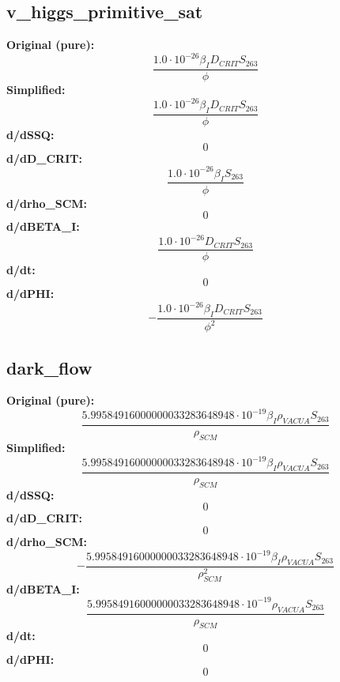 \subsection{v_higgs_primitive_sat}
\textbf{Original (pure):}
\begin{equation}
\frac{1.0 \cdot 10^{-26} \beta_{I} D_{CRIT} S_{26 3}}{\phi}
\end{equation}
\textbf{Simplified:}
\begin{equation}
\frac{1.0 \cdot 10^{-26} \beta_{I} D_{CRIT} S_{26 3}}{\phi}
\end{equation}
\textbf{d/dSSQ:}
\begin{equation}
0
\end{equation}
\textbf{d/dD_CRIT:}
\begin{equation}
\frac{1.0 \cdot 10^{-26} \beta_{I} S_{26 3}}{\phi}
\end{equation}
\textbf{d/drho_SCM:}
\begin{equation}
0
\end{equation}
\textbf{d/dBETA_I:}
\begin{equation}
\frac{1.0 \cdot 10^{-26} D_{CRIT} S_{26 3}}{\phi}
\end{equation}
\textbf{d/dt:}
\begin{equation}
0
\end{equation}
\textbf{d/dPHI:}
\begin{equation}
- \frac{1.0 \cdot 10^{-26} \beta_{I} D_{CRIT} S_{26 3}}{\phi^{2}}
\end{equation}

\subsection{dark_flow}
\textbf{Original (pure):}
\begin{equation}
\frac{5.99584916000000033283648948 \cdot 10^{-19} \beta_{I} \rho_{VAC UA} S_{26 3}}{\rho_{SCM}}
\end{equation}
\textbf{Simplified:}
\begin{equation}
\frac{5.99584916000000033283648948 \cdot 10^{-19} \beta_{I} \rho_{VAC UA} S_{26 3}}{\rho_{SCM}}
\end{equation}
\textbf{d/dSSQ:}
\begin{equation}
0
\end{equation}
\textbf{d/dD_CRIT:}
\begin{equation}
0
\end{equation}
\textbf{d/drho_SCM:}
\begin{equation}
- \frac{5.99584916000000033283648948 \cdot 10^{-19} \beta_{I} \rho_{VAC UA} S_{26 3}}{\rho_{SCM}^{2}}
\end{equation}
\textbf{d/dBETA_I:}
\begin{equation}
\frac{5.99584916000000033283648948 \cdot 10^{-19} \rho_{VAC UA} S_{26 3}}{\rho_{SCM}}
\end{equation}
\textbf{d/dt:}
\begin{equation}
0
\end{equation}
\textbf{d/dPHI:}
\begin{equation}
0
\end{equation}


